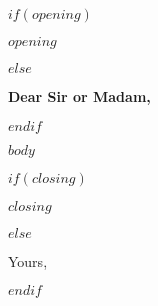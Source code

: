 \documentclass{letter}
\date{$date$}
\begin{document}
\begin{letter}{} %

$if(opening)$
\opening{\textbf{$opening$}}
$else$
\opening{\textbf{Dear Sir or Madam,}}
$endif$

$body$

\vspace{2\parskip} %
$if(closing)$
\closing{$closing$}
$else$
\closing{Yours,}
$endif$
\vspace{2\parskip} %

\end{letter}
\end{document}
